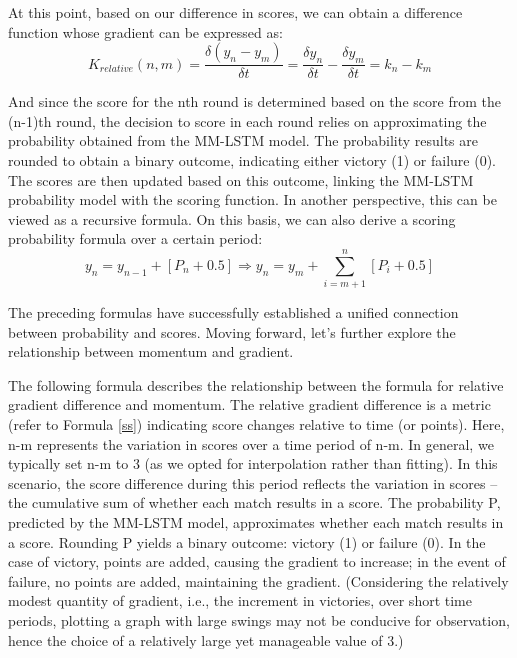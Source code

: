 At this point, based on our difference in scores, we can obtain a difference function whose gradient can be expressed as:
\begin{equation}
\label{ss}
    {K_{relative}}{(n, m)} = \frac{\delta (y_n - y_m)}{\delta t} = 
    \frac{\delta y_n}{\delta t} -   \frac{\delta y_m}{\delta t}
    = k_n - k_m
\end{equation}

And since the score for the nth round is determined based on the score from the (n-1)th round, the decision to score in each round relies on approximating the probability obtained from the MM-LSTM model. The probability results are rounded to obtain a binary outcome, indicating either victory (1) or failure (0). The scores are then updated based on this outcome, linking the MM-LSTM probability model with the scoring function. In another perspective, this can be viewed as a recursive formula. On this basis, we can also derive a scoring probability formula over a certain period:
\begin{equation}
    y_n = y_{n-1} + [P_n+0.5] \Longrightarrow
    y_n = y_m + \sum_{i=m+1}^{n} [P_i + 0.5] 
\end{equation}

The preceding formulas have successfully established a unified connection between probability and scores. Moving forward, let's further explore the relationship between momentum and gradient.

The following formula describes the relationship between the formula for relative gradient difference and momentum. The relative gradient difference is a metric (refer to Formula \ref{ss}) indicating score changes relative to time (or points). Here, n-m represents the variation in scores over a time period of n-m. In general, we typically set n-m to 3 (as we opted for interpolation rather than fitting). In this scenario, the score difference during this period reflects the variation in scores – the cumulative sum of whether each match results in a score. The probability P, predicted by the MM-LSTM model, approximates whether each match results in a score. Rounding P yields a binary outcome: victory (1) or failure (0). In the case of victory, points are added, causing the gradient to increase; in the event of failure, no points are added, maintaining the gradient. (Considering the relatively modest quantity of gradient, i.e., the increment in victories, over short time periods, plotting a graph with large swings may not be conducive for observation, hence the choice of a relatively large yet manageable value of 3.)

